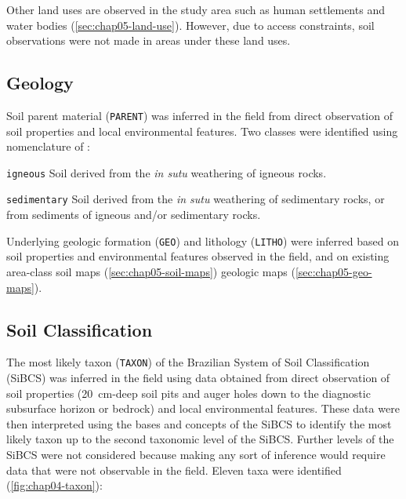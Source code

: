 Other land uses are observed in the study area such as human settlements and water bodies 
(\autoref{sec:chap05-land-use}). However, due to access constraints, soil observations were not made in areas 
under these land uses.

\subsection{Geology}

Soil parent material (\texttt{PARENT}) was inferred in the field from direct observation of soil properties 
and local environmental features. Two classes were identified using nomenclature of \cite{FAO2006}:

\begin{description}
\item \texttt{igneous} Soil derived from the \textit{in sutu} weathering of igneous rocks.
\item \texttt{sedimentary} Soil derived from the \textit{in sutu} weathering of sedimentary rocks, or from 
sediments of igneous and/or sedimentary rocks.
\end{description}

Underlying geologic formation (\texttt{GEO}) and lithology (\texttt{LITHO}) were inferred based on soil 
properties and environmental features observed in the field, and on existing area-class soil maps 
(\autoref{sec:chap05-soil-maps}) geologic maps (\autoref{sec:chap05-geo-maps}).

\subsection{Soil Classification}

The most likely taxon (\texttt{TAXON}) of the Brazilian System of Soil Classification (SiBCS) 
\cite{SantosEtAl2013a} was inferred in the field using data obtained from direct observation of soil 
properties (\SI{20}{\centi\metre}-deep soil pits and auger holes down to the diagnostic subsurface horizon or 
bedrock) and local environmental features. These data were then interpreted using the bases and concepts of 
the SiBCS to identify the most likely taxon up to the second taxonomic level of the SiBCS. Further levels of 
the SiBCS were not considered because making any sort of inference would require data that were not observable 
in the field. Eleven taxa were identified (\autoref{fig:chap04-taxon}):

